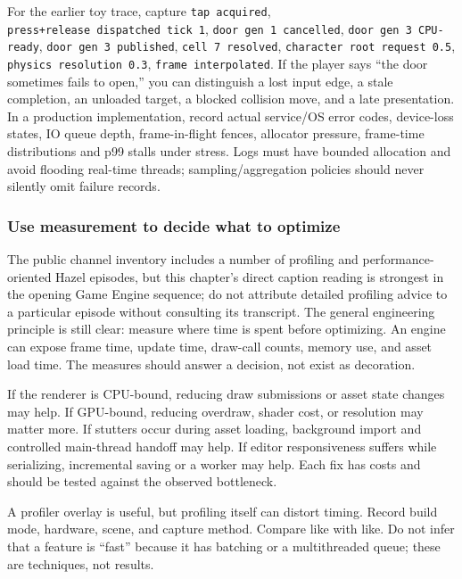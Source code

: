 For the earlier toy trace, capture \texttt{tap\ acquired}, \texttt{press+release\ dispatched\ tick\ 1}, \texttt{door\ gen\ 1\ cancelled}, \texttt{door\ gen\ 3\ CPU-ready}, \texttt{door\ gen\ 3\ published}, \texttt{cell\ 7\ resolved}, \texttt{character\ root\ request\ 0.5}, \texttt{physics\ resolution\ 0.3}, \texttt{frame\ interpolated}. If the player says ``the door sometimes fails to open,'' you can distinguish a lost input edge, a stale completion, an unloaded target, a blocked collision move, and a late presentation. In a production implementation, record actual service/OS error codes, device-loss states, IO queue depth, frame-in-flight fences, allocator pressure, frame-time distributions and p99 stalls under stress. Logs must have bounded allocation and avoid flooding real-time threads; sampling/aggregation policies should never silently omit failure records.

\subsubsection{Use measurement to decide what to optimize}\label{use-measurement-to-decide-what-to-optimize}

The public channel inventory includes a number of profiling and performance-oriented Hazel episodes, but this chapter's direct caption reading is strongest in the opening Game Engine sequence; do not attribute detailed profiling advice to a particular episode without consulting its transcript. The general engineering principle is still clear: measure where time is spent before optimizing. An engine can expose frame time, update time, draw-call counts, memory use, and asset load time. The measures should answer a decision, not exist as decoration.

If the renderer is CPU-bound, reducing draw submissions or asset state changes may help. If GPU-bound, reducing overdraw, shader cost, or resolution may matter more. If stutters occur during asset loading, background import and controlled main-thread handoff may help. If editor responsiveness suffers while serializing, incremental saving or a worker may help. Each fix has costs and should be tested against the observed bottleneck.

A profiler overlay is useful, but profiling itself can distort timing. Record build mode, hardware, scene, and capture method. Compare like with like. Do not infer that a feature is ``fast'' because it has batching or a multithreaded queue; these are techniques, not results.

